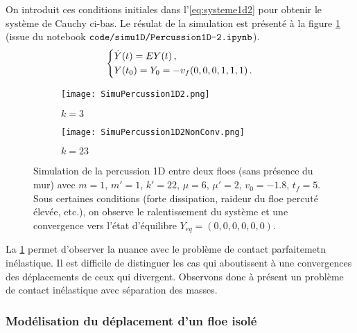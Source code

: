 \noindent On introduit ces conditions initiales dans l'\cref{eq:systeme1d2} pour obtenir le système de Cauchy ci-bas. Le résulat de la simulation est présenté à la figure \cref{fig:simucontact1d2} (issue du notebook $\verb|code/simu1D/Percussion1D-2.ipynb|$). 
\begin{align} \label{eq:systeme1d3}
    \begin{dcases}
        \dot{Y}(t)= E Y(t) \,, \\
        Y(t_0) = Y_0 = -v_f(0,0,0,1,1,1) \,.        
    \end{dcases}
\end{align}

\begin{figure}[!h]
    \centering
    \begin{subfigure}{0.45\textwidth}
        \centering
        \texttt{[image: SimuPercussion1D2.png]}
        \caption{$k=3$}
    \end{subfigure}
    \begin{subfigure}{0.45\textwidth}
        \centering
        \texttt{[image: SimuPercussion1D2NonConv.png]}
        \caption{$k=23$}
    \end{subfigure}

    \caption{Simulation de la percussion 1D entre deux floes (sans présence du mur) avec $m=1$, $m'=1$, $k'=22$, $\mu=6$, $\mu'=2$, $v_0=-1.8$, $t_{f}=5$. Sous certaines conditions (forte dissipation, raideur du floe percuté élevée, etc.), on observe le ralentissement du système et une convergence vers l'état d'équilibre $Y_{eq}=(0,0,0,0,0,0)$.} 
    \label{fig:simucontact1d2}
\end{figure}

\noindent La \cref{fig:simucontact1d2} permet d'observer la nuance avec le problème de contact parfaitemetn inélastique. Il est difficile de distinguer les cas qui aboutissent à une convergences des déplacements de ceux qui divergent. Observons donc à présent un problème de contact inélastique avec séparation des masses.









\subsubsection{Modélisation du déplacement d'un floe isolé}
\label{subsubsec:moddep1D}


